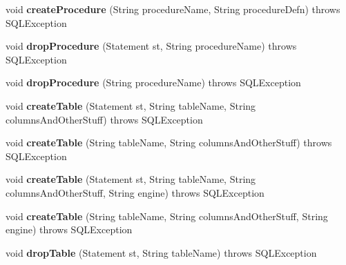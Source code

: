 \begin{DoxyCompactItemize}
\mbox{\label{classtestsuite_1_1_base_test_case_a5d65f7a995144e564691da9ee898406a}} 
void {\bfseries create\+Procedure} (String procedure\+Name, String procedure\+Defn)  throws S\+Q\+L\+Exception 
\item 
\mbox{\label{classtestsuite_1_1_base_test_case_a479da62297639342738924a0c27f88af}} 
void {\bfseries drop\+Procedure} (Statement st, String procedure\+Name)  throws S\+Q\+L\+Exception 
\item 
\mbox{\label{classtestsuite_1_1_base_test_case_ae81b9c574af66ec9f7af48837aca37fc}} 
void {\bfseries drop\+Procedure} (String procedure\+Name)  throws S\+Q\+L\+Exception 
\item 
\mbox{\label{classtestsuite_1_1_base_test_case_a9b100bed1696694cdede1b8181bdf70a}} 
void {\bfseries create\+Table} (Statement st, String table\+Name, String columns\+And\+Other\+Stuff)  throws S\+Q\+L\+Exception 
\item 
\mbox{\label{classtestsuite_1_1_base_test_case_afa4c0d18646a12915f111869b2275b87}} 
void {\bfseries create\+Table} (String table\+Name, String columns\+And\+Other\+Stuff)  throws S\+Q\+L\+Exception 
\item 
\mbox{\label{classtestsuite_1_1_base_test_case_a16751e4f9c11d900e1d37e7f073950cd}} 
void {\bfseries create\+Table} (Statement st, String table\+Name, String columns\+And\+Other\+Stuff, String engine)  throws S\+Q\+L\+Exception 
\item 
\mbox{\label{classtestsuite_1_1_base_test_case_a46f784bec92e5fb4b4c8fcdb7817c4b3}} 
void {\bfseries create\+Table} (String table\+Name, String columns\+And\+Other\+Stuff, String engine)  throws S\+Q\+L\+Exception 
\item 
\mbox{\label{classtestsuite_1_1_base_test_case_a84f311adb4febe06deab08a132f85eaf}} 
void {\bfseries drop\+Table} (Statement st, String table\+Name)  throws S\+Q\+L\+Exception 
\item 

\end{DoxyCompactItemize}
